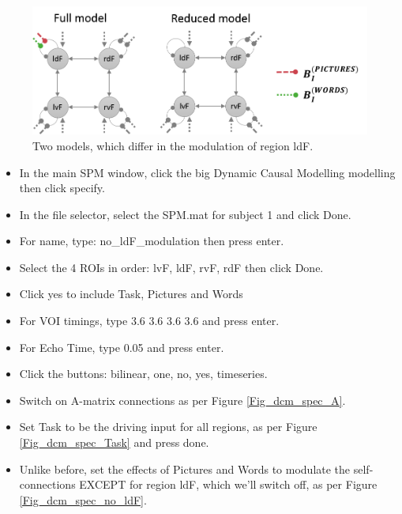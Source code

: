 \documentclass{article}
\begin{document}
\begin{figure}[ht]
\begin{center}
\includegraphics{"Fig_dcm_spec_2models"}
\caption{Two models, which differ in the modulation of region ldF.\label{Fig_dcm_spec_2models}}
\end{center}
\end{figure}

\begin{itemize}
    \item In the main SPM window, click the big Dynamic Causal Modelling modelling then click specify.
    \item In the file selector, select the SPM.mat for subject 1 and click Done.
    \item For name, type: no\_ldF\_modulation then press enter.
    \item Select the 4 ROIs in order: lvF, ldF, rvF, rdF then click Done.
    \item Click yes to include Task, Pictures and Words
    \item For VOI timings, type 3.6  3.6  3.6  3.6 and press enter. 
    \item For Echo Time, type 0.05 and press enter.
    \item Click the buttons: bilinear, one, no, yes, timeseries.
    \item Switch on A-matrix connections as per Figure \ref{Fig_dcm_spec_A}.
    \item Set Task to be the driving input for all regions, as per Figure \ref{Fig_dcm_spec_Task} and press done.
    \item Unlike before, set the effects of Pictures and Words to modulate the self-connections EXCEPT for region ldF, which we'll switch off, as per Figure \ref{Fig_dcm_spec_no_ldF}.
\end{itemize}
\end{document}
